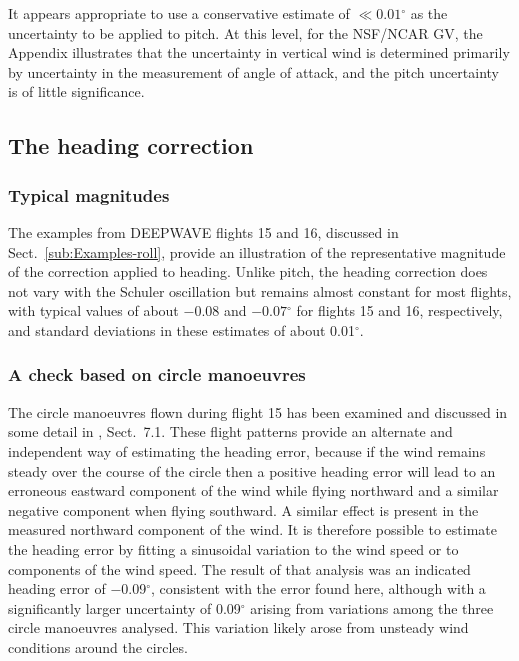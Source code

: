 \documentclass[english,british,amtd,bookmarks=false,unicode=true]{copernicus}\usepackage[]{graphicx}\usepackage[]{color}
\begin{document}
It appears appropriate to use a conservative estimate of $\ll0.01{}^{\circ}$
as the uncertainty to be applied to pitch. At this level, for the
NSF/NCAR GV, the Appendix illustrates that the uncertainty in vertical
wind is determined primarily by uncertainty in the measurement of
angle of attack, and the pitch uncertainty is of little significance.


\subsection{The heading correction}


\subsubsection{Typical magnitudes}

The examples from DEEPWAVE flights 15 and 16, discussed in Sect.~\ref{sub:Examples-roll},
provide an illustration of the representative magnitude of the correction
applied to heading. Unlike pitch, the heading correction does not
vary with the Schuler oscillation but remains almost constant for
most flights, with typical values of about \ensuremath{-0.08}
and \ensuremath{-0.07}$^{\circ}$ for flights 15 and 16, respectively,
and standard deviations in these estimates of about 0.01$^{\circ}$. 


\subsubsection{A check based on circle manoeuvres}

The circle manoeuvres flown during flight 15 has been examined and
discussed in some detail in \citet{Cooper2016ncartn}, Sect.~7.1.
These flight patterns provide an alternate and independent way of
estimating the heading error, because if the wind remains steady over
the course of the circle then a positive heading error will lead to
an erroneous eastward component of the wind while flying northward
and a similar negative component when flying southward. A similar
effect is present in the measured northward component of the wind.
It is therefore possible to estimate the heading error by fitting
a sinusoidal variation to the wind speed or to components of the wind
speed. The result of that analysis was an indicated heading error
of $-$0.09$^{\circ}$, consistent with the error found here, although
with a significantly larger uncertainty of 0.09$^{\circ}$ arising
from variations among the three circle manoeuvres analysed. This variation
likely arose from unsteady wind conditions around the circles.
\end{document}
